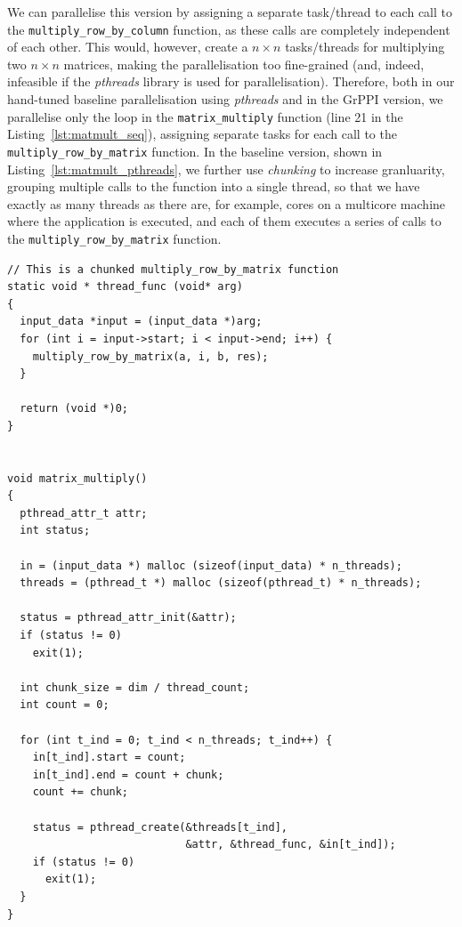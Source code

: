 \noindent
We can parallelise this version by assigning a separate task/thread to each call to the \lstinline{multiply_row_by_column} function, as these calls are completely independent of each other. This would, however, create a $n \times n$ tasks/threads for multiplying two $n \times n$ matrices, making the parallelisation too fine-grained (and, indeed, infeasible if the \emph{pthreads} library is used for parallelisation). Therefore, both in our hand-tuned baseline parallelisation using \emph{pthreads} and in the GrPPI version, we parallelise only the loop in the \lstinline{matrix_multiply} function (line 21 in the Listing~\ref{lst:matmult_seq}), assigning separate tasks for each call to the \lstinline{multiply_row_by_matrix} function. In the baseline version, shown in Listing~\ref{lst:matmult_pthreads}, we further use \emph{chunking} to increase granluarity, grouping multiple calls to the function into a single thread, so that we have exactly as many threads as there are, for example, cores on a multicore machine where the application is executed, and each of them executes a series of calls to the \lstinline{multiply_row_by_matrix} function.

\begin{small}
  \begin{lstlisting}[caption=Baseline (\emph{pthreads}) Parallel Matrix Multiplication\label{lst:matmult_pthreads}]
// This is a chunked multiply_row_by_matrix function    
static void * thread_func (void* arg)
{
  input_data *input = (input_data *)arg;
  for (int i = input->start; i < input->end; i++) {
    multiply_row_by_matrix(a, i, b, res);
  }

  return (void *)0;
}


void matrix_multiply()
{
  pthread_attr_t attr;
  int status;

  in = (input_data *) malloc (sizeof(input_data) * n_threads);
  threads = (pthread_t *) malloc (sizeof(pthread_t) * n_threads);

  status = pthread_attr_init(&attr);
  if (status != 0)
    exit(1);

  int chunk_size = dim / thread_count;
  int count = 0;

  for (int t_ind = 0; t_ind < n_threads; t_ind++) {
    in[t_ind].start = count;
    in[t_ind].end = count + chunk;
    count += chunk;

    status = pthread_create(&threads[t_ind],
                            &attr, &thread_func, &in[t_ind]);
    if (status != 0)
      exit(1);
  }
}
  \end{lstlisting}  
\end{small}

